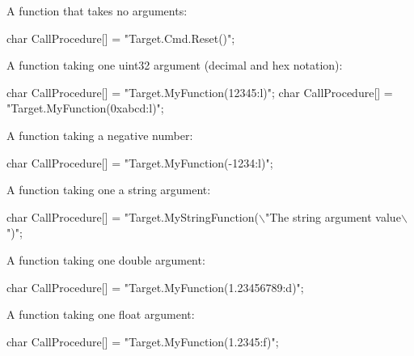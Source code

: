A function that takes no arguments\+: 
\begin{DoxyCode}
\textcolor{keywordtype}{char} CallProcedure[] = \textcolor{stringliteral}{"Target.Cmd.Reset()"};
\end{DoxyCode}
 A function taking one uint32 argument (decimal and hex notation)\+: 
\begin{DoxyCode}
\textcolor{keywordtype}{char} CallProcedure[] = \textcolor{stringliteral}{"Target.MyFunction(12345:l)"};
\textcolor{keywordtype}{char} CallProcedure[] = \textcolor{stringliteral}{"Target.MyFunction(0xabcd:l)"};
\end{DoxyCode}
 A function taking a negative number\+: 
\begin{DoxyCode}
\textcolor{keywordtype}{char} CallProcedure[] = \textcolor{stringliteral}{"Target.MyFunction(-1234:l)"};
\end{DoxyCode}
 A function taking one a string argument\+: 
\begin{DoxyCode}
\textcolor{keywordtype}{char} CallProcedure[] = \textcolor{stringliteral}{"Target.MyStringFunction(\(\backslash\)"The string argument value\(\backslash\)")"};
\end{DoxyCode}
 A function taking one double argument\+: 
\begin{DoxyCode}
\textcolor{keywordtype}{char} CallProcedure[] = \textcolor{stringliteral}{"Target.MyFunction(1.23456789:d)"};
\end{DoxyCode}
 A function taking one float argument\+: 
\begin{DoxyCode}
\textcolor{keywordtype}{char} CallProcedure[] = \textcolor{stringliteral}{"Target.MyFunction(1.2345:f)"};
\end{DoxyCode}
 